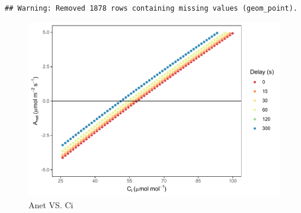 \documentclass[
]{krantz}
\begin{document}
\begin{verbatim}
## Warning: Removed 1878 rows containing missing values (geom_point).
\end{verbatim}

\begin{figure}
\centering
\includegraphics{bookdown_files/figure-latex/anetci-1.pdf}
\caption{\label{fig:anetci}Anet VS. Ci}
\end{figure}
\end{document}
